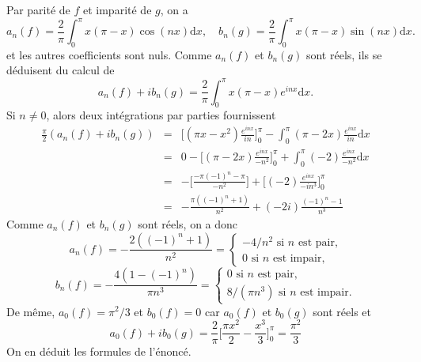 \documentclass[12pt,a4paper]{article}
\def\d{\mathrm{d}}
\newcounter{exercice}
\begin{document}
Par parité de $f$ et imparité de $g$, on a 
$$a_n(f) = \frac{2}{\pi}\int_{0}^{\pi} x(\pi-x)\cos(nx)  \d x, \quad 
b_n(g) = \frac{2}{\pi}\int_{0}^{\pi} x(\pi-x)\sin(nx) \d x.$$
et les autres coefficients sont nuls.
Comme $a_n(f)$ et $b_n(g)$ sont réels, ils se déduisent du calcul de 
$$a_n(f) + ib_n(g) = \frac{2}{\pi}\int_{0}^{\pi} x(\pi-x)e^{inx} \d x.$$
Si $n \ne 0$, alors deux intégrations par parties fournissent
\begin{eqnarray*}
\frac{\pi}{2}(a_n(f) + ib_n(g))
&=& \Big[(\pi x - x^2)\frac{e^{inx}}{in}\Big]_{0}^{\pi}
- \int_{0}^{\pi} (\pi-2x)\frac{e^{inx}}{in} \d x \\
&=& 0 - \Big[(\pi-2x)\frac{e^{inx}}{-n^2}\Big]_{0}^{\pi}
+ \int_{0}^{\pi} (-2)\frac{e^{inx}}{-n^2} \d x \\
&=& - \Big[\frac{-\pi(-1)^n-\pi}{-n^2}\Big]
+ \Big[(-2)\frac{e^{inx}}{-in^3}\Big]_{0}^{\pi} \\
&=& - \frac{\pi((-1)^n+1)}{n^2}
+ (-2i)\frac{(-1)^n-1}{n^3}
\end{eqnarray*}
Comme $a_n(f)$ et $b_n(g)$ sont réels, on a donc 
$$a_n(f) = - \frac{2((-1)^n+1)}{n^2} = 
\begin{cases}
-4/n^2 \textrm{ si } n \text{ est pair,}\\
0 \textrm{ si } n \text{ est impair,}
\end{cases}$$
$$b_n(f) = - \frac{4(1-(-1)^n)}{\pi n^3} = 
\begin{cases}
0 \textrm{ si } n \text{ est pair,}\\
8/(\pi n^3) \textrm{ si } n \text{ est impair.}
\end{cases}$$
De même, $a_0(f) = \pi^2/3$ et $b_0(f) = 0$ 
car $a_0(f)$ et $b_0(g)$ sont réels et 
$$a_0(f) + ib_0(g) 
= \frac{2}{\pi}\Big[\frac{\pi x^2}{2}-\frac{x^3}{3}\Big]_{0}^{\pi} 
= \frac{\pi^2}{3}$$
On en déduit les formules de l'énoncé. 



\end{document}
